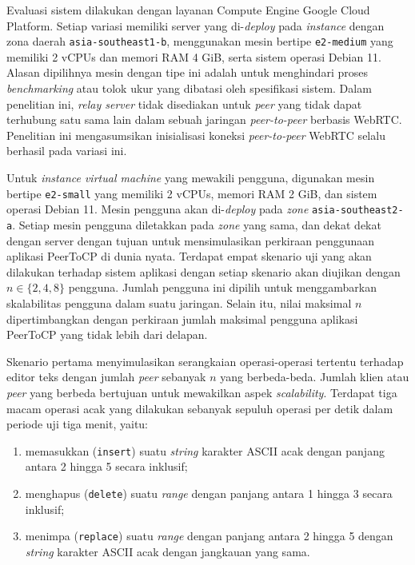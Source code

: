 Evaluasi sistem dilakukan dengan layanan Compute Engine Google Cloud Platform. Setiap variasi memiliki server yang di-\textit{deploy} pada \textit{instance} dengan zona daerah \texttt{asia-southeast1-b}, menggunakan mesin bertipe \texttt{e2-medium} yang memiliki 2 vCPUs dan memori RAM 4 GiB, serta sistem operasi Debian 11. Alasan dipilihnya mesin dengan tipe ini adalah untuk menghindari proses \textit{benchmarking} atau tolok ukur yang dibatasi oleh spesifikasi sistem. Dalam penelitian ini, \textit{relay server} tidak disediakan untuk \textit{peer} yang tidak dapat terhubung satu sama lain dalam sebuah jaringan \textit{peer-to-peer} berbasis WebRTC. Penelitian ini mengasumsikan inisialisasi koneksi \textit{peer-to-peer} WebRTC selalu berhasil pada variasi ini.

Untuk \textit{instance virtual machine} yang mewakili pengguna, digunakan mesin bertipe \texttt{e2-small} yang memiliki 2 vCPUs, memori RAM 2 GiB, dan sistem operasi Debian 11. Mesin pengguna akan di-\textit{deploy} pada \textit{zone} \texttt{asia-southeast2-a}. Setiap mesin pengguna diletakkan pada \textit{zone} yang sama, dan dekat dekat dengan server dengan tujuan untuk mensimulasikan perkiraan penggunaan aplikasi PeerToCP di dunia nyata. Terdapat empat skenario uji yang akan dilakukan terhadap sistem aplikasi dengan setiap skenario akan diujikan dengan $n \in \{2, 4, 8\}$ pengguna. Jumlah pengguna ini dipilih untuk menggambarkan skalabilitas pengguna dalam suatu jaringan. Selain itu, nilai maksimal $n$ dipertimbangkan dengan perkiraan jumlah maksimal pengguna aplikasi PeerToCP yang tidak lebih dari delapan.

Skenario pertama menyimulasikan serangkaian operasi-operasi tertentu terhadap editor teks dengan jumlah \textit{peer} sebanyak $n$ yang berbeda-beda. Jumlah klien atau \textit{peer} yang berbeda bertujuan untuk mewakilkan aspek \textit{scalability}. Terdapat tiga macam operasi acak yang dilakukan sebanyak sepuluh operasi per detik dalam periode uji tiga menit, yaitu:

\begin{enumerate}[nolistsep]
    \item memasukkan (\texttt{insert}) suatu \textit{string} karakter ASCII acak dengan panjang antara 2 hingga 5 secara inklusif;
    \item menghapus (\texttt{delete}) suatu \textit{range} dengan panjang antara 1 hingga 3 secara inklusif;
    \item menimpa (\texttt{replace}) suatu \textit{range} dengan panjang antara 2 hingga 5 dengan \textit{string} karakter ASCII acak dengan jangkauan yang sama.
\end{enumerate}


